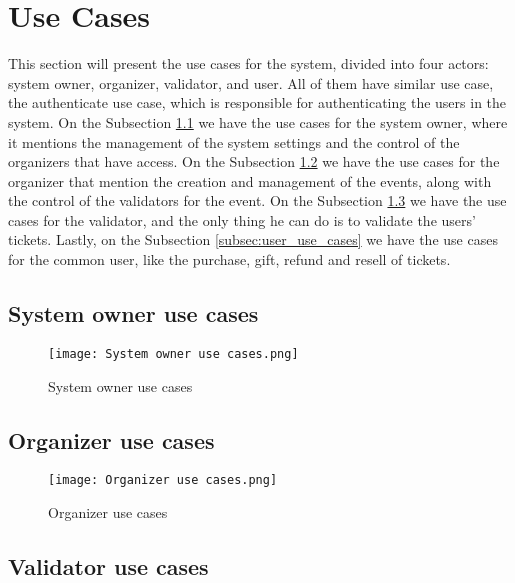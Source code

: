 \section{Use Cases}
\label{sec:use_cases}

This section will present the use cases for the system, divided into four actors: system owner, organizer, validator, and user. All of them have similar use case, the authenticate use case, which is responsible for authenticating the users in the system.
On the Subsection \ref{subsec:system_owner_use_cases} we have the use cases for the system owner, where it mentions the management of the system settings and the control of the organizers that have access.
On the Subsection \ref{subsec:organizer_use_cases} we have the use cases for the organizer that mention the creation and management of the events, along with the control of the validators for the event.
On the Subsection \ref{subsec:validator_use_cases} we have the use cases for the validator, and the only thing he can do is to validate the users' tickets.
Lastly, on the Subsection \ref{subsec:user_use_cases} we have the use cases for the common user, like the purchase, gift, refund and resell of tickets.

\subsection{System owner use cases}
\label{subsec:system_owner_use_cases}

\begin{figure}[H]
    \texttt{[image: System owner use cases.png]}
    \centering
    \caption{System owner use cases}
    \label{fig:system_owner_use_cases}
\end{figure}

\subsection{Organizer use cases}
\label{subsec:organizer_use_cases}

\begin{figure}[H]
    \texttt{[image: Organizer use cases.png]}
    \centering
    \caption{Organizer use cases}
    \label{fig:organizer_use_cases}
\end{figure}

\subsection{Validator use cases}
\label{subsec:validator_use_cases}


